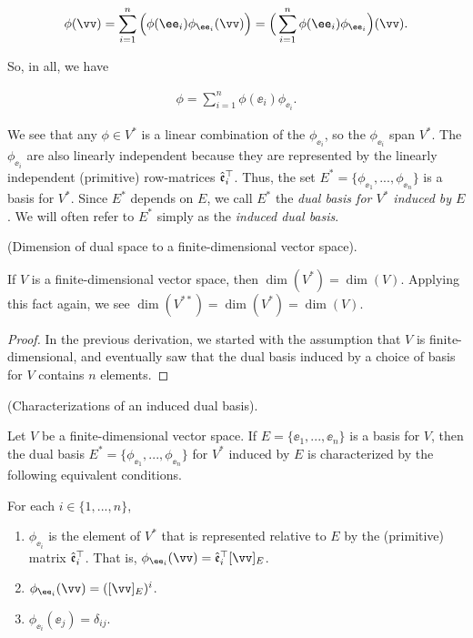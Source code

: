 \begin{deriv}
    \begin{align*}
        \phi(\vv) 
        = \sum_{i = 1}^n \Big( \phi(\ee_i) \phi_{\ee_i}(\vv) \Big)
        = \Big( \sum_{i = 1}^n \phi(\ee_i) \phi_{\ee_i} \Big)(\vv).
    \end{align*}
    
    So, in all, we have
    
    \begin{align*}
        \phi = \sum_{i = 1}^n \phi(\ee_i) \phi_{\ee_i}.
    \end{align*}
    
    We see that any $\phi \in V^*$ is a linear combination of the $\phi_{\ee_i}$, so the $\phi_{\ee_i}$ span $V^*$. The $\phi_{\ee_i}$ are also linearly independent because they are represented by the linearly independent (primitive) row-matrices $\hat{\mathfrak{e}}_i^\top$. Thus, the set $E^* = \{\phi_{\ee_1}, ..., \phi_{\ee_n}\}$ is a basis for $V^*$. Since $E^*$ depends on $E$, we call $E^*$ the \textit{dual basis for $V^*$ induced by $E$}. We will often refer to $E^*$ simply as the \textit{induced dual basis}.
\end{deriv}

\begin{theorem}
\label{ch::motivated_intro::deriv::dim_dual_space}
    (Dimension of dual space to a finite-dimensional vector space).
    
    If $V$ is a finite-dimensional vector space, then $\dim(V^*) = \dim(V)$. Applying this fact again, we see $\dim(V^{**}) = \dim(V^*) = \dim(V)$.
\end{theorem}

\begin{proof}
    In the previous derivation, we started with the assumption that $V$ is finite-dimensional, and eventually saw that the dual basis induced by a choice of basis for $V$ contains $n$ elements.
\end{proof}

\begin{theorem}
    (Characterizations of an induced dual basis).
     
    Let $V$ be a finite-dimensional vector space. If $E = \{\ee_1, ..., \ee_n\}$ is a basis for $V$, then the dual basis $E^* = \{\phi_{\ee_1}, ..., \phi_{\ee_n}\}$ for $V^*$ induced by $E$ is characterized by the following equivalent conditions.
    
    \vspace{.25cm}
    
    For each $i \in \{1, ..., n\}$,
     
    \begin{enumerate}
        \item $\phi_{\ee_i}$ is the element of $V^*$ that is represented relative to $E$ by the (primitive) matrix $\hat{\mathfrak{e}}_i^\top$. That is, $\phi_{\ee_i}(\vv) = \see_i^\top [\vv]_E$.
        \item $\phi_{\ee_i}(\vv) = ([\vv]_E)^i$.
        \item $\phi_{\ee_i}(\ee_j) = \delta_{ij}$.
    \end{enumerate}
\end{theorem}

